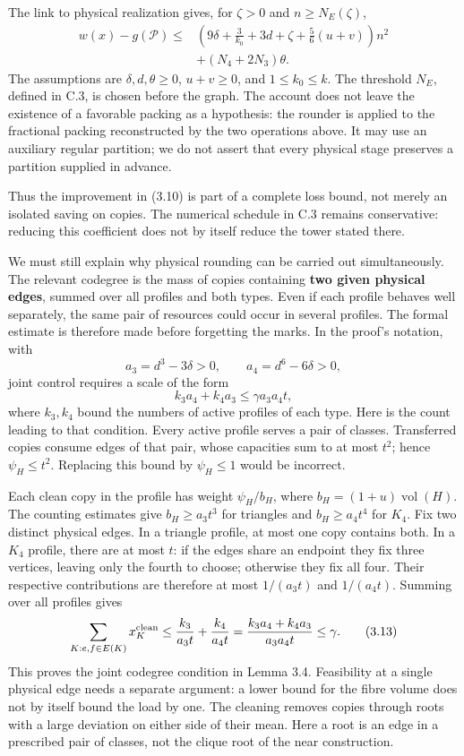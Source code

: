 \documentclass[english,11pt,a4paper]{article}
\begin{document}
The link to physical realization gives, for \(\zeta>0\) and \(n\ge N_E(\zeta)\), \[
\begin{aligned}
w(x)-g(\mathcal P)\le{}&
\left(9\delta+\frac3{k_0}+3d+\zeta
             +\frac56(u+v)\right)n^2\\
&+(N_4+2N_3)\theta .
\end{aligned}
\tag{3.11}
\] The assumptions are \(\delta,d,\theta\ge0\), \(u+v\ge0\), and \(1\le k_0\le k\). The threshold \(N_E\), defined in C.3, is chosen before the graph. The account does not leave the existence of a favorable packing as a hypothesis: the rounder is applied to the fractional packing reconstructed by the two operations above. It may use an auxiliary regular partition; we do not assert that every physical stage preserves a partition supplied in advance.

Thus the improvement in (3.10) is part of a complete loss bound, not merely an isolated saving on copies. The numerical schedule in C.3 remains conservative: reducing this coefficient does not by itself reduce the tower stated there.

We must still explain why physical rounding can be carried out simultaneously. The relevant codegree is the mass of copies containing \textbf{two given physical edges}, summed over all profiles and both types. Even if each profile behaves well separately, the same pair of resources could occur in several profiles. The formal estimate is therefore made before forgetting the marks. In the proof's notation, with \[
a_3=d^3-3\delta>0,\qquad a_4=d^6-6\delta>0,
\] joint control requires a scale of the form \[
k_3a_4+k_4a_3\le\gamma a_3a_4t,
\tag{3.12}
\] where \(k_3,k_4\) bound the numbers of active profiles of each type. Here is the count leading to that condition. Every active profile serves a pair of classes. Transferred copies consume edges of that pair, whose capacities sum to at most \(t^2\); hence \(\psi_H\le t^2\). Replacing this bound by \(\psi_H\le1\) would be incorrect.

Each clean copy in the profile has weight \(\psi_H/b_H\), where \(b_H=(1+u)\operatorname{vol}(H)\). The counting estimates give \(b_H\ge a_3t^3\) for triangles and \(b_H\ge a_4t^4\) for \(K_4\). Fix two distinct physical edges. In a triangle profile, at most one copy contains both. In a \(K_4\) profile, there are at most \(t\): if the edges share an endpoint they fix three vertices, leaving only the fourth to choose; otherwise they fix all four. Their respective contributions are therefore at most \(1/(a_3t)\) and \(1/(a_4t)\). Summing over all profiles gives \[
\sum_{K:e,f\in E(K)}x_K^{\rm clean}
\le\frac{k_3}{a_3t}+\frac{k_4}{a_4t}
=\frac{k_3a_4+k_4a_3}{a_3a_4t}\le\gamma.
\tag{3.13}
\] This proves the joint codegree condition in Lemma 3.4. Feasibility at a single physical edge needs a separate argument: a lower bound for the fibre volume does not by itself bound the load by one. The cleaning removes copies through roots with a large deviation on either side of their mean. Here a root is an edge in a prescribed pair of classes, not the clique root of the near construction.
\end{document}
